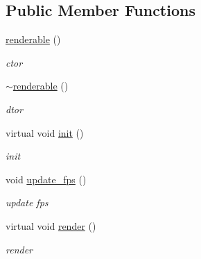 \subsection*{Public Member Functions}
\begin{DoxyCompactItemize}
\item 
\hyperlink{classnebula_1_1framework_1_1renderable_a73471e2ece67b41d57aa8f30cd23f555}{renderable} ()
\begin{DoxyCompactList}\small\item\em ctor \item\end{DoxyCompactList}\item 
\hyperlink{classnebula_1_1framework_1_1renderable_ac1f325f502745a9b64f3dc737d1c6d85}{$\sim$renderable} ()
\begin{DoxyCompactList}\small\item\em dtor \item\end{DoxyCompactList}\item 
virtual void \hyperlink{classnebula_1_1framework_1_1renderable_abd26325cc94b96a9d471a63d74260406}{init} ()
\begin{DoxyCompactList}\small\item\em init \item\end{DoxyCompactList}\item 
void \hyperlink{classnebula_1_1framework_1_1renderable_aea9d32d02b305c788f8046396d0d0fe3}{update\_\-fps} ()
\begin{DoxyCompactList}\small\item\em update fps \item\end{DoxyCompactList}\item 
virtual void \hyperlink{classnebula_1_1framework_1_1renderable_a97ba14a1d360e248ce8a82a3d2b7e15d}{render} ()
\begin{DoxyCompactList}\small\item\em render \item\end{DoxyCompactList}\end{DoxyCompactItemize}
